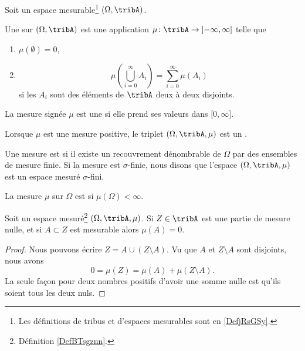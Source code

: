 \begin{definition}  \label{DefBTsgznn}
	Soit un espace mesurable\footnote{Les définitions de tribus et d'espaces mesurables sont en \ref{DefjRsGSy}.} \( (\Omega,\tribA)\).

	Une  sur \( (\Omega,\tribA)\) est une application \(\mu \colon \tribA\to \mathopen] -\infty,\infty\mathclose]  \) telle que
	\begin{enumerate}
		\item
		      \( \mu(\emptyset)=0\),
		\item       \label{ItemQFjtOjXiii}
		      \begin{equation}		\label{EQooKJHQooHIQyUj}
			      \mu\left( \bigcup_{i=0}^{\infty}A_i\right)=\sum_{i=0}^{\infty}\mu(A_i)
		      \end{equation}
		      si les \( A_i\) sont des éléments de \( \tribA\) deux à deux disjoints.
	\end{enumerate}

	La mesure signée \( \mu\) est une   si elle prend ses valeurs dans \( \mathopen[ 0,\infty\mathclose]\).

	Lorsque \( \mu\) est une mesure positive, le triplet \( (\Omega,\tribA,\mu)\) est un .

	Une mesure est  si il existe un recouvrement dénombrable de \( \Omega\) par des ensembles de mesure finie. Si la mesure est \( \sigma\)-finie, nous disons que l'espace \( (\Omega,\tribA,\mu)\) est un espace mesuré \( \sigma\)-fini.

	La mesure \( \mu\) sur \( \Omega\) est  si \( \mu(\Omega)<\infty\).
\end{definition}

\begin{lemma}	\label{LEMooECDQooEBtMxL}
	Soit un espace mesuré\footnote{Définition \ref{DefBTsgznn}.} \( (\Omega,\tribA,\mu)\). Si \( Z\in\tribA\) est une partie de mesure nulle, et si \( A\subset Z\) est mesurable alors \( \mu(A)=0\).
\end{lemma}

\begin{proof}
	Nous pouvons écrire \( Z=A\cup (Z\setminus A)\). Vu que \( A\) et \( Z\setminus A\) sont disjoints, nous avons
	\begin{equation}
		0=\mu(Z)=\mu(A)+\mu(Z\setminus A).
	\end{equation}
	La seule façon pour deux nombres positifs d'avoir une somme nulle est qu'ils soient tous les deux nuls.
\end{proof}

